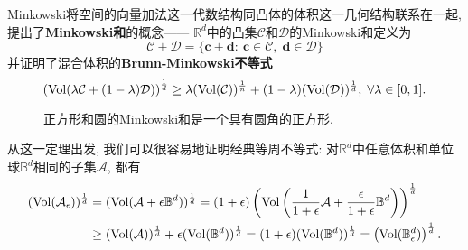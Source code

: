 Minkowski将空间的向量加法这一代数结构同凸体的体积这一几何结构联系在一起, 提出了\textbf{Minkowski和}的概念——
$\mathbb{R}^d$中的凸集$\mathcal{C}$和$\mathcal{D}$的Minkowski和定义为
\begin{equation*}
	\mathcal{C} + \mathcal{D} = \{\bm{c} + \bm{d} \colon\: \bm{c} \in \mathcal{C},\; \bm{d} \in \mathcal{D}\} 
\end{equation*}
并证明了混合体积的\textbf{Brunn-Minkowski不等式}
\begin{equation}\label{eq:BM1}
	\left( \operatorname{Vol}(\lambda \mathcal{C} + (1-\lambda) \mathcal{D})  \right)^{\frac1d}
	\geq \lambda (\operatorname{Vol}(\mathcal{C}))^{\frac1n} + (1-\lambda) (\operatorname{Vol}(\mathcal{D}))^{\frac1d},\;
	\forall \lambda \in [0,1]. 
\end{equation}
\begin{figure}[H]
	\centering
	\caption{正方形和圆的Minkowski和是一个具有圆角的正方形.}
\end{figure}
\noindent
从这一定理出发, 我们可以很容易地证明经典等周不等式: 对$\mathbb{R}^d$中任意体积和单位球$\mathbb{B}^d$相同的子集$\mathcal{A}$, 都有 
\begin{align*}
	(\operatorname{Vol}(\mathcal{A}_{\epsilon}))^{\frac1d}
	&= (\operatorname{Vol}(\mathcal{A} + \epsilon \mathbb{B}^d))^{\frac1d}
	= (1+\epsilon) \left(\operatorname{Vol}\left(\frac{1}{1+\epsilon} \mathcal{A} + \frac{\epsilon}{1+\epsilon} \mathbb{B}^d\right)\right)^{\frac1d} \\
	&\geq (\operatorname{Vol}(\mathcal{A}))^{\frac1d} + \epsilon (\operatorname{Vol}(\mathbb{B}^d))^{\frac1d} 
	= (1+\epsilon) (\operatorname{Vol}(\mathbb{B}^d))^{\frac1d} 
	= \left( \operatorname{Vol}(\mathbb{B}^d_{\epsilon}) \right)^{\frac1d}. 
\end{align*}

